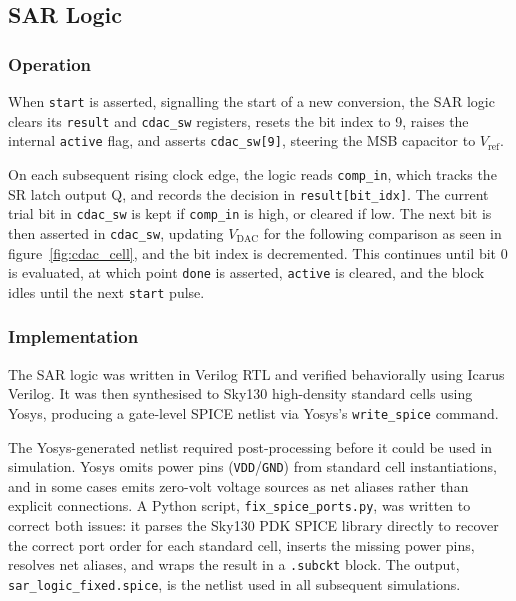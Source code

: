 \documentclass[12pt, a4paper]{article}
\begin{document}
\subsection{SAR Logic}
\label{subsection:sar_logic}

\subsubsection{Operation}

When \texttt{start} is asserted, signalling the start of a new conversion, the SAR logic clears its \texttt{result} and \texttt{cdac\_sw} registers, resets the bit index to 9, raises the internal \texttt{active} flag, and asserts \texttt{cdac\_sw[9]}, steering the MSB capacitor to $V_\mathrm{ref}$.

On each subsequent rising clock edge, the logic reads \texttt{comp\_in}, which tracks the SR latch output Q, and records the decision in \texttt{result[bit\_idx]}. The current trial bit in \texttt{cdac\_sw} is kept if \texttt{comp\_in} is high, or cleared if low. The next bit is then asserted in \texttt{cdac\_sw}, updating $V_\mathrm{DAC}$ for the following comparison as seen in figure~\ref{fig:cdac_cell}, and the bit index is decremented. This continues until bit 0 is evaluated, at which point \texttt{done} is asserted, \texttt{active} is cleared, and the block idles until the next \texttt{start} pulse.

\subsubsection{Implementation}
The SAR logic was written in Verilog RTL and verified behaviorally using Icarus Verilog. It was then synthesised to Sky130 high-density standard cells using Yosys, producing a gate-level SPICE netlist via Yosys's \texttt{write\_spice} command.

The Yosys-generated netlist required post-processing before it could be used in simulation. Yosys omits power pins (\texttt{VDD}/\texttt{GND}) from standard cell instantiations, and in some cases emits zero-volt voltage sources as net aliases rather than explicit connections. A Python script, \texttt{fix\_spice\_ports.py}, was written to correct both issues: it parses the Sky130 PDK SPICE library directly to recover the correct port order for each standard cell, inserts the missing power pins, resolves net aliases, and wraps the result in a \texttt{.subckt} block. The output, \texttt{sar\_logic\_fixed.spice}, is the netlist used in all subsequent simulations.
\end{document}
